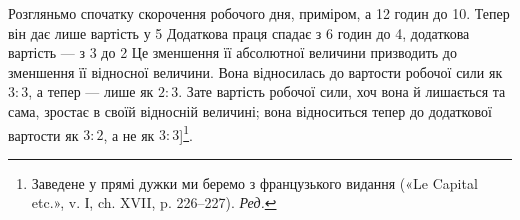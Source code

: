 Розгляньмо спочатку скорочення робочого дня, приміром,
а 12 годин до 10. Тепер він дає лише вартість у 5 Додаткова
праця спадає з 6 годин до 4, додаткова вартість — з 3
до 2 Це зменшення її абсолютної величини
призводить до зменшення її відносної величини. Вона відносилась
до вартости робочої сили як $3: 3$, а тепер — лише як $2: 3$. Зате
вартість робочої сили, хоч вона й лишається та сама, зростає
в своїй відносній величині; вона відноситься тепер до додаткової
вартости як $3: 2$, а не як $3: 3$]\footnote*{
Заведене у прямі дужки ми беремо з французького видання («Le
Capital etc.», v. І, ch. XVII, p. 226--227). \emph{Ред.}
}.
\parbreak{}  %
